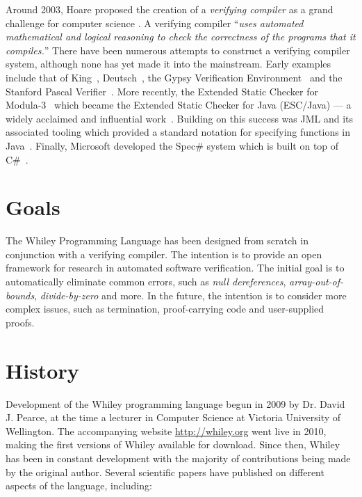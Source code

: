 Around 2003, Hoare proposed the creation of a {\em verifying compiler} as a grand challenge for computer science \cite{Hoare03}.  A verifying compiler ``{\em uses automated mathematical and logical reasoning to check the correctness of the programs that it compiles.}''  There have been numerous attempts to construct a verifying compiler system, although none has yet made it into the mainstream.  Early examples include that of King~\cite{King69}, Deutsch~\cite{Deutsch73}, the Gypsy Verification Environment~\cite{Good85} and the Stanford Pascal Verifier~\cite{LGHKMOPS95}.  More recently, the Extended Static Checker for Modula-3~\cite{DLNS98} which became the Extended Static Checker for Java (ESC/Java) --- a widely acclaimed and influential work~\cite{FLLNSS02}.  Building on this success was JML and its associated tooling which provided a standard notation for specifying functions in Java~\cite{LCCRC05}.  Finally, Microsoft developed the Spec\# system which is built on top of C\#~\cite{BLS04}.%

\section{Goals}

The Whiley Programming Language has been designed from scratch in conjunction with a verifying compiler.  The intention is to provide an open framework for research in automated software verification.  The initial goal is to automatically eliminate common errors, such as {\em null dereferences}, {\em array-out-of-bounds}, {\em divide-by-zero} and more.  In the future, the intention is to consider more complex issues, such as termination, proof-carrying code and user-supplied proofs.

\section{History}

Development of the Whiley programming language begun in 2009 by Dr. David J. Pearce, at the time a lecturer in Computer Science at Victoria University of Wellington.  The accompanying website \url{http://whiley.org} went live in 2010, making the first versions of Whiley available for download.  Since then, Whiley has been in constant development with the majority of contributions being made by the original author.  Several scientific papers have published on different aspects of the language, including:


